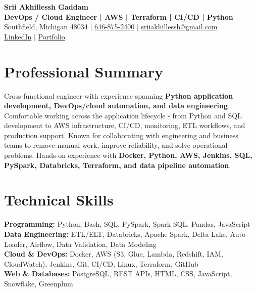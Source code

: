 \documentclass[letterpaper,10pt]{article}
\begin{document}
\fontsize{9.35pt}{10.45pt}\selectfont

\begin{center}
    {\LARGE \textbf{Srii Akhillessh Gaddam}} \\[-1pt]
    \textbf{DevOps / Cloud Engineer | AWS | Terraform | CI/CD | Python} \\[2pt]
    Southfield, Michigan 48034 $|$
    \href{tel:6468752400}{646-875-2400} $|$
    \href{mailto:sriiakhillessh@gmail.com}{sriiakhillessh@gmail.com} \\[1pt]
    \href{https://www.linkedin.com/in/srii-akhiilessh-gaddam-b48668191/}{LinkedIn} $|$
    \href{https://sriiakhillesshg.github.io/portfolio/}{Portfolio}
\end{center}
\vspace{-8pt}

\section{Professional Summary}
\small{Cross-functional engineer with experience spanning \textbf{Python application development, DevOps/cloud automation, and data engineering}. Comfortable working across the application lifecycle - from Python and SQL development to AWS infrastructure, CI/CD, monitoring, ETL workflows, and production support. Known for collaborating with engineering and business teams to remove manual work, improve reliability, and solve operational problems. Hands-on experience with \textbf{Docker, Python, AWS, Jenkins, SQL, PySpark, Databricks, Terraform, and data pipeline automation}.}

\section{Technical Skills}
\small{
\textbf{Programming:} Python, Bash, SQL, PySpark, Spark SQL, Pandas, JavaScript \\
\textbf{Data Engineering:} ETL/ELT, Databricks, Apache Spark, Delta Lake, Auto Loader, Airflow, Data Validation, Data Modeling \\
\textbf{Cloud \& DevOps:} Docker, AWS (S3, Glue, Lambda, Redshift, IAM, CloudWatch), Jenkins, Git, CI/CD, Linux, Terraform, GitHub \\
\textbf{Web \& Databases:} PostgreSQL, REST APIs, HTML, CSS, JavaScript, Snowflake, Greenplum
}
\end{document}
